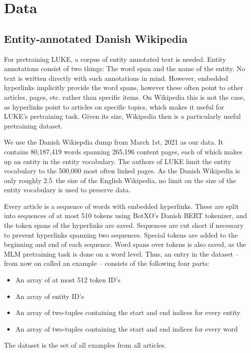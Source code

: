 \documentclass[main.tex]{subfiles}
\begin{document}
\chapter{Data}
\label{chap:data}

\section{Entity-annotated Danish Wikipedia}
For pretraining LUKE, a corpus of entity annotated text is needed.
Entity annotations consist of two things: The word span and the name of the entity.
No text is written directly with such annotations in mind.
However, embedded hyperlinks implicitly provide the word spans, however these often point to other articles, pages, etc. rather than specific items.
On Wikipedia this is not the case, as hyperlinks point to articles on specific topics, which makes it useful for LUKE's pretraining task.
Given its size, Wikipedia then is a particularly useful pretraining dataset.

We use the Danish Wikiepdia dump from March 1st, 2021 as our data.
It contains 80,187,419 words spanning 265,196 content pages, each of which makes up an entity in the entity vocabulary.
The authors of LUKE limit the entity vocabulary to the 500,000 most often linked pages.
As the Danish Wikipedia is only roughly 2.5\pro\ the size of the English Wikipedia, no limit on the size of the entity vocabulary is used to preserve data.

Every article is a sequence of words with embedded hyperlinks.
These are split into sequences of at most 510 tokens using BotXO's Danish BERT tokenizer, and the token spans of the hyperlinks are saved.
Sequences are cut short if necessary to prevent hyperlinks spanning two sequences.
Special tokens are added to the beginning and end of each sequence.
Word spans over tokens is also saved, as the MLM pretraining task is done on a word level.
Thus, an entry in the dataset -- from now on called an example -- consists of the following four parts:
\begin{itemize}
    \item An array of at most 512 token ID's
    \item An array of entity ID's
    \item An array of two-tuples containing the start and end indices for every entity
    \item An array of two-tuples containing the start and end indices for every word
\end{itemize}
The dataset is the set of all examples from all articles.
\end{document}
